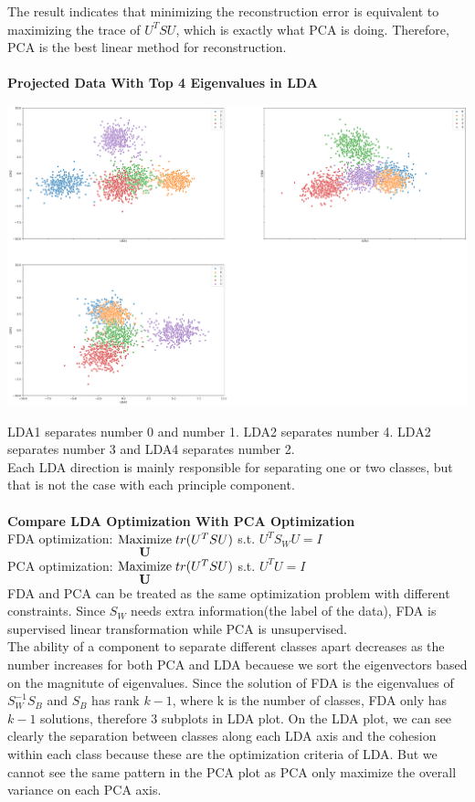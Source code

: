 \documentclass[12pt]{article}
\begin{document}
\noindent
The result indicates that minimizing the reconstruction error is equivalent to maximizing the trace of $U^TSU$, which is exactly what PCA is doing. Therefore, PCA is the best linear method for reconstruction.\\\\
\textbf{Projected Data With Top 4 Eigenvalues in LDA}
\vspace*{-1.0cm}
\begin{center}
    \includegraphics[width=18cm]{Q2_LDATop3.png}
\end{center}
\noindent
LDA1 separates number 0 and number 1. LDA2 separates number 4. LDA2 separates number 3 and LDA4 separates number 2.\\
Each LDA direction is mainly responsible for separating one or two classes, but that is not the case with each principle component.\\\\
\textbf{Compare LDA Optimization With PCA Optimization}\\
FDA optimization: $\stackunder{Maximize}{\textbf{U}}\;tr(U^TSU)$ s.t. $U^TS_WU=I$\\
PCA optimization: $\stackunder{Maximize}{\textbf{U}}\;tr(U^TSU)$ s.t. $U^TU=I$\\
FDA and PCA can be treated as the same optimization problem with different constraints. Since $S_W$ needs extra information(the label of the data), FDA is supervised linear transformation while PCA is unsupervised.\\
The ability of a component to separate different classes apart decreases as the number increases for both PCA and LDA becauese we sort the eigenvectors based on the magnitute of eigenvalues. Since the solution of FDA is the eigenvalues of $S_W^{-1}S_B$ and $S_B$ has rank $k-1$, where k is the number of classes, FDA only has $k-1$ solutions, therefore 3 subplots in LDA plot. On the LDA plot, we can see clearly the separation between classes along each LDA axis and the cohesion within each class because these are the optimization criteria of LDA. But we cannot see the same pattern in the PCA plot as PCA only maximize the overall variance on each PCA axis.
\end{document}
